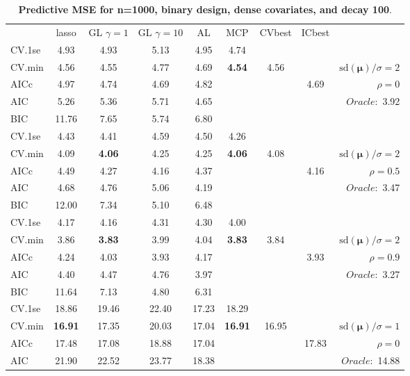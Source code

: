 \begin{table}\vspace{-.5cm}
\caption[l]{ { \bf Predictive MSE for n=1000, binary design, 
dense covariates, and  decay  100}.}
\vspace{-.5cm}
\footnotesize{}
\begin{center}
\begin{tabular}{l*{7}{c}|r}
 & lasso & GL $\gamma=1$ & GL $\gamma=10$ & AL & MCP  & CVbest & ICbest  \\
\cline{1-9}
CV.1se & 4.93 & 4.93 & 5.13 & 4.95 & 4.74 & & & \\
CV.min & 4.56 & 4.55 & 4.77 & 4.69 & {\bf 4.54} & 4.56 & & $\mathrm{sd}(\mathbf{\mu})/\sigma=2$ \\
AICc & 4.97 & 4.74 & 4.69 & 4.82 & & & 4.69 &  $\rho=0$ \\
AIC & 5.26 & 5.36 & 5.71 & 4.65 & & & &  \multirow{2}{*}{$Oracle: $ 3.92} \\
BIC & 11.76 & 7.65 & 5.74 & 6.80 & & & &  \\
 \hline 
CV.1se & 4.43 & 4.41 & 4.59 & 4.50 & 4.26 & & & \\
CV.min & 4.09 & {\bf 4.06} & 4.25 & 4.25 & {\bf 4.06} & 4.08 & & $\mathrm{sd}(\mathbf{\mu})/\sigma=2$ \\
AICc & 4.49 & 4.27 & 4.16 & 4.37 & & & 4.16 &  $\rho=0.5$ \\
AIC & 4.68 & 4.76 & 5.06 & 4.19 & & & &  \multirow{2}{*}{$Oracle: $ 3.47} \\
BIC & 12.00 & 7.34 & 5.10 & 6.48 & & & &  \\
 \hline 
CV.1se & 4.17 & 4.16 & 4.31 & 4.30 & 4.00 & & & \\
CV.min & 3.86 & {\bf 3.83} & 3.99 & 4.04 & {\bf 3.83} & 3.84 & & $\mathrm{sd}(\mathbf{\mu})/\sigma=2$ \\
AICc & 4.24 & 4.03 & 3.93 & 4.17 & & & 3.93 &  $\rho=0.9$ \\
AIC & 4.40 & 4.47 & 4.76 & 3.97 & & & &  \multirow{2}{*}{$Oracle: $ 3.27} \\
BIC & 11.64 & 7.13 & 4.80 & 6.31 & & & &  \\
 \hline 
CV.1se & 18.86 & 19.46 & 22.40 & 17.23 & 18.29 & & & \\
CV.min & {\bf 16.91} & 17.35 & 20.03 & 17.04 & {\bf 16.91} & 16.95 & & $\mathrm{sd}(\mathbf{\mu})/\sigma=1$ \\
AICc & 17.48 & 17.08 & 18.88 & 17.04 & & & 17.83 &  $\rho=0$ \\
AIC & 21.90 & 22.52 & 23.77 & 18.38 & & & &  \multirow{2}{*}{$Oracle: $ 14.88} \\

\end{tabular}
\end{center}
\end{table}
